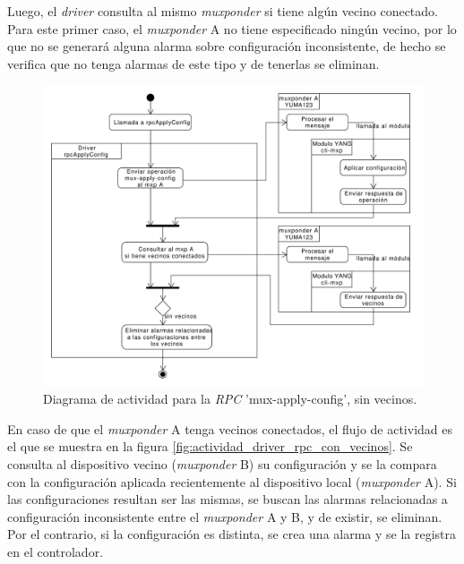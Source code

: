   Luego, el \textit{driver} consulta al mismo \textit{muxponder} si tiene algún vecino conectado. Para este primer caso, el \textit{muxponder} A no tiene especificado ningún vecino, por lo que no se generará alguna alarma sobre configuración inconsistente, de hecho se verifica que no tenga alarmas de este tipo y de tenerlas se eliminan.


  \begin{figure}[H]
    \centering
    \includegraphics[scale=0.45]{Figures/actividad_driver_rpc_sin_vecinos.pdf}
    \caption{Diagrama de actividad para la \textit{RPC} 'mux-apply-config', sin vecinos.}
    \label{fig:actividad_driver_rpc_sin_vecinos}
  \end{figure}

  En caso de que el \textit{muxponder} A tenga vecinos conectados, el flujo de actividad es el que se muestra en la figura \ref{fig:actividad_driver_rpc_con_vecinos}. Se consulta al dispositivo vecino (\textit{muxponder} B) su configuración y se la compara con la configuración aplicada recientemente al dispositivo local (\textit{muxponder} A). Si las configuraciones resultan ser las mismas, se buscan las alarmas relacionadas a configuración inconsistente entre el \textit{muxponder} A y B, y de existir, se eliminan. Por el contrario, si la configuración es distinta, se crea una alarma y se la registra en el controlador.

